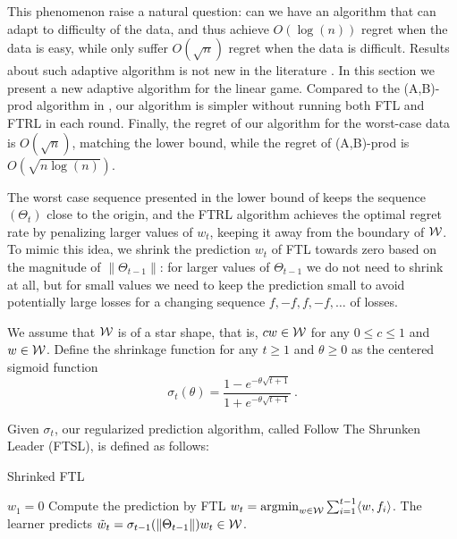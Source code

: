 This phenomenon raise a natural question: can we have an algorithm that can adapt to difficulty of the data, and thus achieve $O(\log(n))$ regret when the data is easy, while only suffer $O(\sqrt{n})$ regret when the data is difficult.
Results about such adaptive algorithm is not new in the literature \citep{sani2014exploiting,bubeck2012best}. 
In this section we present a new adaptive algorithm for the linear game. Compared to the (A,B)-prod algorithm in \citep{sani2014exploiting}, our algorithm is simpler without running both FTL and FTRL in each round. 
Finally, the regret of our algorithm for the worst-case data is $O(\sqrt{n})$, matching the lower bound, while the regret of (A,B)-prod is $O(\sqrt{n\log(n)})$.

The worst case sequence presented in the lower bound of \citet{abernethy2008optimal} keeps the sequence $(\Theta_t)$ close to the origin, and the FTRL algorithm achieves the optimal regret rate by penalizing larger values of $w_t$, keeping it away from the boundary of $\mathcal{W}$. To mimic this idea, we shrink the prediction $w_t$ of FTL towards zero based on the magnitude of $\|\Theta_{t-1}\|$: for larger values of $\Theta_{t-1}$ we do not need to shrink at all, but for small values we need to keep the prediction small to avoid potentially large losses for a changing sequence $f,-f,f,-f,\ldots$ of losses. 

We assume that $\mathcal{W}$ is of a star shape, that is, $c w\in\mathcal{W}$ for any $0 \le c \le1$ and $w\in\mathcal{W}$. 
Define the shrinkage function
for any $t \ge 1$ and $\theta \ge 0$ as the centered sigmoid function
\[
\sigma_t(\theta)= \frac{1-e^{-\theta\sqrt{t+1}}}{1+e^{-\theta\sqrt{t+1}}}~.
\]

Given $\sigma_t$, our regularized prediction algorithm, called Follow The Shrunken Leader (FTSL), is defined as follows:
\begin{algorithm}[H]
	\caption{Shrinked FTL}
	\label{alg:FTSL}
	\begin{algorithmic}[1]
		\STATE $w_1 = 0$
		\STATE Compute the prediction by FTL $w_t =  \operatorname*{argmin}_{w\in\mathcal{W}} \sum_{i=1}^{t-1} \langle w, f_i \rangle$.
		\STATE The learner predicts $\tilde{w}_t = \sigma_{t-1}(\|\Theta_{t-1}\|) w_t \in \mathcal{W}$.  %
		\ENDFOR
	\end{algorithmic}
\end{algorithm}

